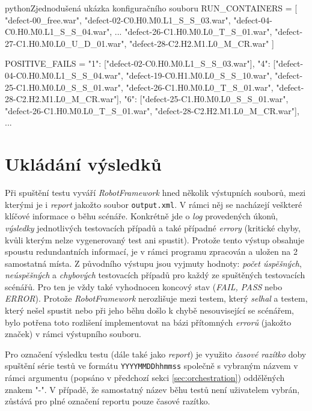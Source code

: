 \documentclass[czech, ma, kiv, he, iso690numb, pdf, viewonly]{fasthesis}
\begin{document}
    \begin{code}{python}{Zjednodušená ukázka konfiguračního souboru \label{lst:configuration}}
RUN_CONTAINERS = [
    "defect-00_free.war",
    "defect-02-C0.H0.M0.L1_S_S_03.war",
    "defect-04-C0.H0.M0.L1_S_S_04.war",
    ...
    "defect-26-C1.H0.M0.L0_T_S_01.war",
    "defect-27-C1.H0.M0.L0_U_D_01.war",
    "defect-28-C2.H2.M1.L0_M_CR.war"
]

POSITIVE_FAILS = {
    "1": ["defect-02-C0.H0.M0.L1_S_S_03.war"],
    "4": ["defect-04-C0.H0.M0.L1_S_S_04.war", "defect-19-C0.H1.M0.L0_S_S_10.war", "defect-25-C1.H0.M0.L0_S_S_01.war", "defect-26-C1.H0.M0.L0_T_S_01.war", "defect-28-C2.H2.M1.L0_M_CR.war"],
    "6": ["defect-25-C1.H0.M0.L0_S_S_01.war", "defect-26-C1.H0.M0.L0_T_S_01.war", "defect-28-C2.H2.M1.L0_M_CR.war"],
    ...
}\end{code}
    
    \section{Ukládání výsledků} \label{sec:reports}
    Při spuštění testu vyváří \textit{RobotFramework} hned několik výstupních souborů, mezi kterými je i \textit{report} jakožto soubor \verb|output.xml|. V rámci něj se nacházejí veškteré klíčové informace o běhu scénáře. Konkrétně jde o \textit{log} provedených úkonů, \textit{výsledky} jednotlivých testovacích případů a také případné \textit{errory} (kritické chyby, kvůli kterým nelze vygenerovaný test ani spustit). Protože tento výstup obsahuje spoustu redundantních informací, je v rámci programu zpracován a uložen na 2 samostatná místa. Z původního výstupu jsou vyjmuty hodnoty: \textit{počet úspěšných}, \textit{neúspěšných} a \textit{chybových} testovacích případů pro každý ze spuštěných testovacích scénářů. Pro ten je vždy také vyhodnocen koncový stav (\textit{FAIL, PASS} nebo \textit{ERROR}). Protože \textit{RobotFramework} nerozlišuje mezi testem, který \emph{selhal} a testem, který nešel spustit nebo při jeho běhu došlo k chybě nesouvisející se scénářem, bylo potřena toto rozlišení implementovat na bázi přítomných \textit{errorů} (jakožto značek) v rámci výstupního souboru. 

    Pro označení výsledku testu (dále také jako \emph{report}) je využito \textit{časové razítko} doby spuštění série testů ve formátu \verb|YYYYMMDDhhmmss| společně s vybraným názvem v rámci argumentu (popsáno v předchozí sekci \ref{sec:orchestration}) oddělěných znakem "-". V případě, že samostatný název běhu testů není uživatelem vybrán, zůstává pro plné označení reportu pouze časové razítko.
\end{document}
